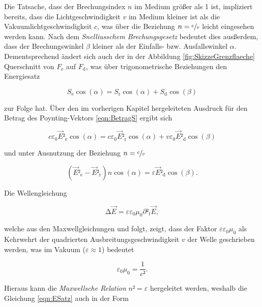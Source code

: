 \noindent Die Tatsache, dass der Brechungsindex $n$ im Medium größer als 1 ist, impliziert bereits, dass die Lichtgeschwindigkeit $v$ im Medium kleiner ist als die
Vakuumlichtgeschwindigkeit $c$, was über die Beziehung $n = \sfrac{c}{v}$ leicht eingesehen werden kann. Nach dem \emph{Snelliusschem Brechungsgesetz} bedeutet dies 
ausßerdem, dass der Brechungswinkel $\beta$ kleiner als der Einfalls- bzw. Ausfallswinkel $\alpha$. Dementsprechend ändert sich auch der in der Abbildung 
\ref{fig:SkizzeGrenzflaeche} Querschnitt von $F_\text{e}$ auf $F_\text{d}$, was über trigonometrische Beziehungen den Energiesatz

\begin{equation*}
    S_\text{e}\cos(\alpha) = S_\text{r}\cos(\alpha) + S_\text{d}\cos(\beta) 
\end{equation*}

\noindent zur Folge hat. Über den im vorherigen Kapitel hergeleiteten Ausdruck für den Betrag des Poynting-Vektors \eqref{eqn:BetragS} ergibt sich 

\begin{equation*}
    c\varepsilon_0\vec{E}²_\text{e}\cos(\alpha) = c\varepsilon_0\vec{E}²_\text{r}\cos(\alpha) + v\varepsilon_0\vec{E}²_\text{d}\cos(\beta)
\end{equation*}

\noindent und unter Ausnutzung der Beziehung $n = \sfrac{c}{v}$

\begin{equation}
    \left(\vec{E}²_\text{e} - \vec{E}²_\text{r}\right)n\cos(\alpha) = \varepsilon\vec{E}²_\text{d}\cos(\beta).
\label{eqn:ESatz}
\end{equation}

\noindent Die Wellengleichung 

\begin{equation*}
    \increment\vec{E} = \varepsilon\varepsilon_0\mu_0\partial²_t\vec{E},
\end{equation*}

\noindent welche aus den Maxwellgleichungen  und  folgt, zeigt, dass der Faktor $\varepsilon\varepsilon_0\mu_0$ als Kehrwehrt der quadrierten Ausbreitungsgeschwindigkeit 
$v$ der Welle geschrieben werden, was im Vakuum ($\varepsilon \approx 1$) bedeutet

\begin{equation*}
    \varepsilon_0\mu_0 = \frac{1}{c²}.
\end{equation*}

\noindent Hieraus kann die \emph{Maxwellsche Relation} $n² = \varepsilon$ hergeleitet werden, weshalb die Gleichung \eqref{eqn:ESatz} auch in der Form 

